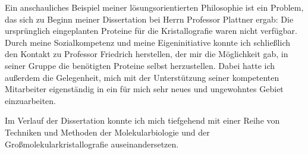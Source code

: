 
Ein anschauliches Beispiel meiner lösungsorientierten Philosophie ist ein Problem, das sich zu Beginn meiner Dissertation bei Herrn Professor Plattner ergab: Die ursprünglich eingeplanten Proteine für die Kristallografie waren nicht verfügbar. Durch meine Sozialkompetenz und meine Eigeninitiative konnte ich schließlich den Kontakt zu Professor Friedrich herstellen, der mir die Möglichkeit gab, in seiner Gruppe die benötigten Proteine selbst herzustellen. Dabei hatte ich außerdem die Gelegenheit, mich mit der Unterstützung seiner kompetenten Mitarbeiter eigenständig in ein für mich sehr neues und ungewohntes Gebiet einzuarbeiten.\par
Im Verlauf der Dissertation konnte ich mich tiefgehend mit einer Reihe von Techniken und Methoden der Molekularbiologie und der Großmolekularkristallografie auseinandersetzen.
